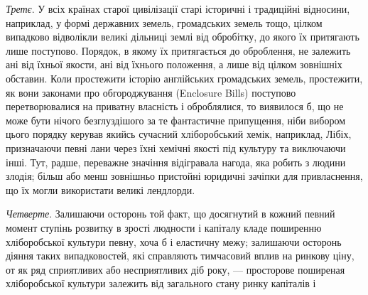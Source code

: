 \emph{Третє}. У всіх країнах старої цивілізації старі історичні і традиційні
відносини, наприклад, у формі державних земель, громадських земель тощо,
цілком випадково відволікли великі дільниці землі від обробітку, до якого їх
притягають лише поступово. Порядок, в якому їх притягається до оброблення,
не залежить ані від їхньої якости, ані від їхнього положення, а лише від цілком
зовнішніх обставин. Коли простежити історію англійських громадських земель,
простежити, як вони законами про обгороджування (Enclosure Bills) поступово перетворювалися
на приватну власність і оброблялися, то виявилося б, що не може
бути нічого безглуздішого за те фантастичне припущення, ніби вибором цього
порядку керував якийсь сучасний хліборобський хемік, наприклад, Лібіх, призначаючи
певні лани через їхні хемічні якості під культуру та виключаючи
інші. Тут, радше, переважне значіння відігравала нагода, яка робить з людини
злодія; більш або менш зовнішньо пристойні юридичні зачіпки для привласнення,
що їх могли використати великі лендлорди.

\emph{Четверте}. Залишаючи осторонь той факт, що досягнутий в кожний
певний момент ступінь розвитку в зрості людности і капіталу кладе поширенню
хліборобської культури певну, хоча б і еластичну межу; залишаючи осторонь
діяння таких випадковостей, які справляють тимчасовий вплив на ринкову
ціну, от як ряд сприятливих або несприятливих діб року, — просторове поширеная
хліборобської культури залежить від загального стану ринку капіталів і
\parbreak{}  %
